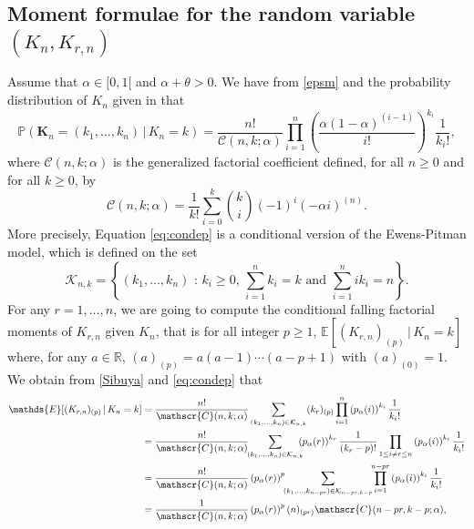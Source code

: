 \documentclass[twoside,12pt]{article}
\newcommand{\dR}{\mathbb{R}}
\newcommand{\dP}{\mathbb{P}}
\newcommand{\E}{\mathds{E}}
\begin{document}
\subsection{Moment formulae for the random variable $(K_{n}, K_{r,n})$}
Assume that $\alpha\in[0,1[$ and  $\alpha+\theta>0$. We have from \eqref{epsm} and 
the probability distribution of $K_{n}$ given in \citep[Equation 3.11]{Pit(06)} that
\begin{equation}\label{eq:condep}
\dP(\mathbf{K}_{n}=(k_{1},\ldots,k_{n})\,|\,K_{n}=k)=\frac{n!}{\mathscr{C}(n,k;\alpha)}
\prod_{i=1}^{n}\left(\frac{\alpha(1-\alpha)^{(i-1)}}{i!}\right)^{k_{i}}\frac{1}{k_{i}!},
\end{equation}
where $\mathscr{C}(n,k;\alpha)$ is the generalized factorial coefficient \citep[Chapter 2]{Cha(05)} defined, for all $n \geq 0$ and for all $k \geq 0$, by
\begin{displaymath}
\mathscr{C}(n,k;\alpha)=\frac{1}{k!}\sum_{i=0}^{k}{k\choose i}(-1)^{i}(-\alpha i)^{(n)}.
\end{displaymath}
More precisely, Equation \eqref{eq:condep} is a conditional version of the Ewens-Pitman model, which is defined on the set
\begin{equation}\label{part_set}
\mathcal{K}_{n,k}=\left\{(k_{1},\ldots,k_{n})\text{ : }k_{i}\geq0,\,\sum_{i=1}^{n}k_{i}=k\text{ and }\sum_{i=1}^{n}ik_{i}=n\right\}.
\end{equation}
For any $r=1,\ldots,n$, we are going to compute the conditional falling factorial moments of $K_{r,n}$ given $K_n$, that is for all integer $p\geq 1$, $\E[(K_{r,n})_{(p)}\,|\,K_{n}=k]$ where, for any $a \in \dR$, 
$(a)_{(p)}=a(a-1)\cdots(a-p+1)$ 
with $(a)_{(0)}=1$. We obtain from \eqref{Sibuya} and \eqref{eq:condep} that
\begin{align}\label{cond_mom1}
\E[(K_{r,n})_{(p)}\,|\,K_{n}=k]
&=\frac{n!}{\mathscr{C}(n,k;\alpha)}\sum_{(k_{1},\ldots,k_{n})\in\mathcal{K}_{n,k}}(k_{r})_{(p)}\prod_{i=1}^{n}\left(p_\alpha(i)\right)^{k_{i}}\frac{1}{k_{i}!} \notag\\
&=\frac{n!}{\mathscr{C}(n,k;\alpha)} \!\! \sum_{(k_{1},\ldots,k_{n})\in\mathcal{K}_{n,k}}
\!\!\!\! \left(p_\alpha(r)\right)^{k_{r}}\frac{1}{(k_{r}-p)!}\prod_{1\leq i\neq r\leq n }\left(p_\alpha(i)\right)^{k_{i}}\frac{1}{k_{i}!} \notag\\
&=\frac{n!}{\mathscr{C}(n,k;\alpha)}\left(p_\alpha(r) \right)^{p}
\!\! \sum_{(k_{1},\ldots,k_{n-pr})\in\mathcal{K}_{n-pr,k-p}} \!\!\prod_{i=1}^{n-pr}\left(p_\alpha(i)\right)^{k_{i}}\frac{1}{k_{i}!} \notag\\
&=\frac{1}{\mathscr{C}(n,k;\alpha)}\left(p_\alpha(r) \right)^{p} (n)_{(pr)} \mathscr{C}(n-pr,k-p;\alpha),
\end{align}
\end{document}
